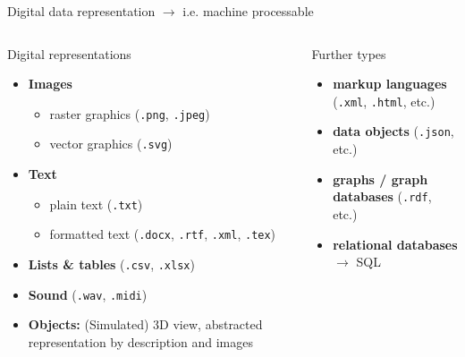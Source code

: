 \begin{frame}{Digital data representation}
\small
$\to$ i.e. \alert{machine processable}

\begin{columns}
\begin{block}{Digital representations}
    \begin{itemize}\footnotesize
        \item \textbf{Images} 
        \begin{itemize}
            \item raster graphics (\texttt{.png}, \texttt{.jpeg}) 
            \item vector graphics (\texttt{.svg})
        \end{itemize}
        \item \textbf{Text}
        \begin{itemize}
            \item plain text (\texttt{.txt})
            \item formatted text (\texttt{.docx}, \texttt{.rtf}, \texttt{.xml}, \texttt{.tex})
        \end{itemize}
        \item \textbf{Lists \& tables} (\texttt{.csv}, \texttt{.xlsx})
        \item \textbf{Sound} (\texttt{.wav}, \texttt{.midi})
        \item \textbf{Objects:} (Simulated) 3D view, abstracted representation by description and images
    \end{itemize}
\end{block}

\begin{block}{Further types}
\begin{itemize}\footnotesize
    \item \textbf{markup languages} (\texttt{.xml}, \texttt{.html}, etc.)
    \item \textbf{data objects} (\texttt{.json}, etc.) 
    \item \textbf{graphs / graph databases} (\texttt{.rdf}, etc.)
    \item \textbf{relational databases} $\to$ SQL 
\end{itemize}
\end{block}
\end{columns}

\end{frame}


